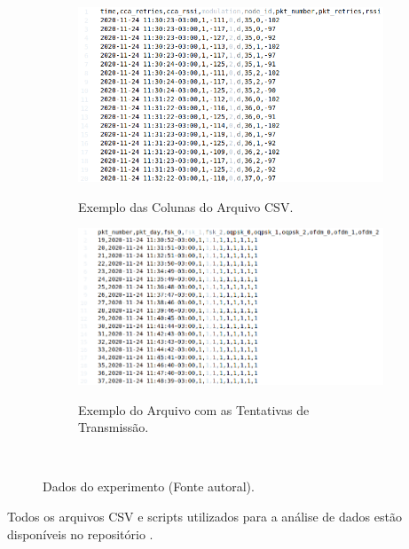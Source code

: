 \begin{figure}[H]
      \centering
      \begin{subfigure}{.45\textwidth}
            \centering
            \caption{Exemplo das Colunas do Arquivo CSV.}
            \includegraphics[width=\textwidth]{./sections/textual/chapters/images/csv_example.png}
            \label{fig:csv_example}
      \end{subfigure}
      \begin{subfigure}{.45\textwidth}
            \centering
            \caption{Exemplo do Arquivo com as Tentativas de Transmissão.}
            \includegraphics[width=\textwidth]{./sections/textual/chapters/images/second_csv_example.png}
            \label{fig:second_csv_example}
      \end{subfigure}
      \\
      \caption{Dados do experimento (Fonte autoral).}
      \label{fig:camposCSV}
\end{figure}

Todos os arquivos CSV e scripts utilizados para a análise de dados estão disponíveis no repositório \cite{wisun-traces}.

